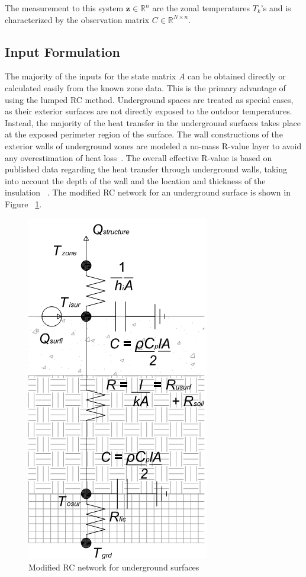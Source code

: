 The measurement to this system $\textbf{z} \in \mathbb{R}^n$ are the zonal temperatures $T_k$'s and is characterized by the observation matrix $C \in \mathbb{R}^{N \times n}$. 

\subsection{Input Formulation}

The majority of the inputs for the state matrix $A$ can be obtained directly or calculated easily from the known zone data. This is the primary advantage of using the lumped RC method. Underground spaces are treated as special cases, as their exterior surfaces are not directly exposed to the outdoor temperatures. Instead, the majority of the heat transfer in the underground surfaces takes place at the exposed perimeter region of the surface. The wall constructions of the exterior walls of underground zones are modeled a no-mass R-value layer to avoid any overestimation of heat loss~\citep{winklemann2003underground}. The overall effective R-value is based on published data regarding the heat transfer through underground walls, taking into account the depth of the wall and the location and thickness of the insulation ~\citep{americanenergy}.  The modified RC network for an underground surface is shown in Figure ~\ref{rc_underground}.

\begin{figure}[H]
\centering
\includegraphics[scale=0.4]{jbs_figures/RC_2}
\caption{Modified RC network for underground surfaces}
\label{rc_underground}
\end{figure}

